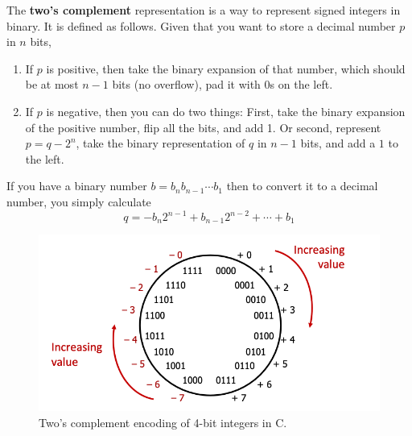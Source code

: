   \begin{theorem}
    The \textbf{two's complement} representation is a way to represent signed integers in binary. It is defined as follows. Given that you want to store a decimal number $p$ in $n$ bits, 

    \begin{enumerate}
      \item If $p$ is positive, then take the binary expansion of that number, which should be at most $n-1$ bits (no overflow), pad it with $0$s on the left. 
      \item If $p$ is negative, then you can do two things: First, take the binary expansion of the positive number, flip all the bits, and add 1. Or second, represent $p = q - 2^n$, take the binary representation of $q$ in $n-1$ bits, and add a $1$ to the left. 
    \end{enumerate}
    If you have a binary number $b = b_{n}b_{n-1}\cdots b_1$ then to convert it to a decimal number, you simply calculate 
    \begin{equation}
      q = -b_{n}2^{n-1} + b_{n-1}2^{n-2} + \cdots + b_1
    \end{equation}
    \begin{figure}[H]
      \centering 
      \includegraphics[scale=0.4]{img/twos_complement_encoding.png}
      \caption{Two's complement encoding of 4-bit integers in C.} 
      \label{fig:twos_complement_encoding}
    \end{figure}
  \end{theorem}

